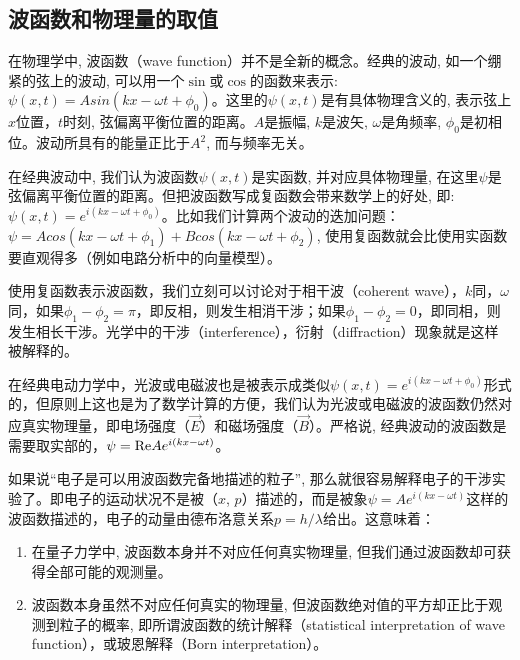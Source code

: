\subsection{波函数和物理量的取值}

在物理学中, 波函数（wave function）并不是全新的概念。经典的波动,
如一个绷紧的弦上的波动, 可以用一个$\sin$或$\cos$的函数来表示:
$\psi(x,t) = A sin (kx-\omega t +
\phi_0)$。这里的$\psi(x,t)$是有具体物理含义的,
表示弦上$x$位置，$t$时刻, 弦偏离平衡位置的距离。$A$是振幅,
$k$是波矢, $\omega$是角频率,
$\phi_0$是初相位。波动所具有的能量正比于$A^2$, 而与频率无关。

在经典波动中, 我们认为波函数$\psi(x,t)$是实函数, 并对应具体物理量,
在这里$\psi$是弦偏离平衡位置的距离。但把波函数写成复函数会带来数学上的好处,
即: $\psi(x,t) = e^{i(kx-\omega t +
\phi_0)}$。比如我们计算两个波动的迭加问题：$\psi = Acos (kx - \omega
t + \phi_1) + B cos (kx - \omega t + \phi_2)$,
使用复函数就会比使用实函数要直观得多（例如电路分析中的向量模型）。

使用复函数表示波函数，我们立刻可以讨论对于相干波（coherent
wave），$k$同，$\omega$同，如果$\phi_1 -
\phi_2=\pi$，即反相，则发生相消干涉；如果$\phi_1 - \phi_2 =
0$，即同相，则发生相长干涉。光学中的干涉（interference），衍射（diffraction）现象就是这样被解释的。

在经典电动力学中，光波或电磁波也是被表示成类似$\psi(x,t) =
e^{i(kx-\omega t +
\phi_0)}$形式的，但原则上这也是为了数学计算的方便，我们认为光波或电磁波的波函数仍然对应真实物理量，即电场强度（$\vec{E}$）和磁场强度（$\vec{B}$）。严格说,
经典波动的波函数是需要取实部的，$\psi  = {\mathop{\rm Re}\nolimits}
Ae^{i(kx - \omega t)} $。

如果说``电子是可以用波函数完备地描述的粒子'',
那么就很容易解释电子的干涉实验了。即电子的运动状况不是被（$x$,
$p$）描述的，而是被象$\psi = A e^{i(kx - \omega
t)}$这样的波函数描述的，电子的动量由德布洛意关系$p = h/
\lambda$给出。这意味着：

\begin{enumerate}
  \item 在量子力学中, 波函数本身并不对应任何真实物理量,
但我们通过波函数却可获得全部可能的观测量。

  \item 波函数本身虽然不对应任何真实的物理量,
但波函数绝对值的平方却正比于观测到粒子的概率,
即所谓波函数的统计解释（statistical interpretation of wave
function），或玻恩解释（Born interpretation）。
\end{enumerate}


